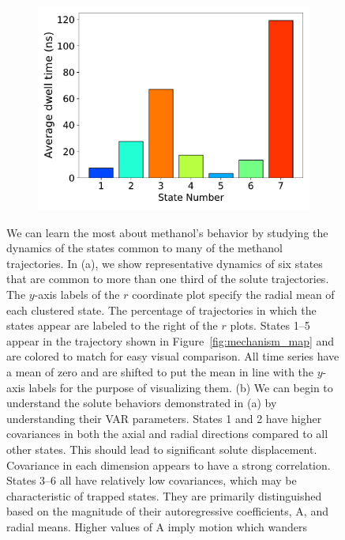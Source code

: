 \documentclass[journal=jpcbfk,manuscript=article]{achemso}
\begin{document}
\begin{figure}
\begin{subfigure}{0.35\textwidth}
  \includegraphics[width=\textwidth]{dwell_times_MET.pdf}  %
  \caption{}\label{fig:dwell_times_MET}
  \end{subfigure}
  \caption{We can learn the most about methanol's behavior by studying the dynamics
  of the states common to many of the methanol trajectories. In (a), we show representative
  dynamics of six states that are common to more than one third of the solute trajectories. 
  The $y$-axis labels of the $r$ coordinate plot specify the radial mean of each clustered 
  state. The percentage of trajectories in which the states appear are labeled to the right of
  the $r$ plots. States 1--5 appear in the trajectory shown in Figure~\ref{fig:mechanism_map}
  and are colored to match for easy visual comparison. All time series have a mean of zero and are
  shifted to put the mean in line with the $y$-axis labels for the purpose of visualizing them. 
  (b) We can begin to understand the solute behaviors demonstrated in (a) by understanding their VAR 
  parameters. States 1 and 2 have higher covariances in both the axial and radial directions compared
  to all other states. This should lead to significant solute displacement. Covariance in each dimension
  appears to have a strong correlation. States 3--6 all have relatively low covariances, which may
  be characteristic of trapped states. They are primarily distinguished based on the magnitude of their 
  autoregressive coefficients, A, and radial means. Higher values of A imply motion which wanders 
}
\end{figure}
\end{document}

